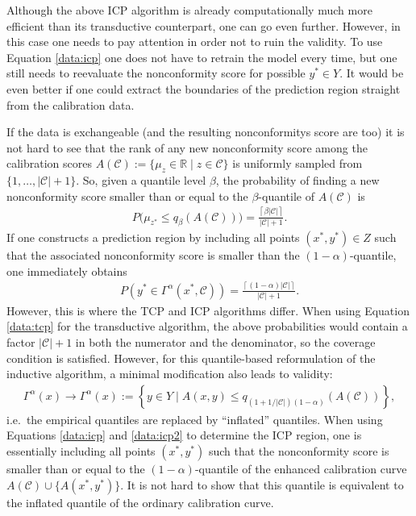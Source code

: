     \begin{property}[Validity]
        Although the above ICP algorithm is already computationally much more efficient than its transductive counterpart, one can go even further. However, in this case one needs to pay attention in order not to ruin the validity. To use Equation \eqref{data:icp} one does not have to retrain the model every time, but one still needs to reevaluate the nonconformity score for possible $y^*\in Y$. It would be even better if one could extract the boundaries of the prediction region straight from the calibration data.

        If the data is exchangeable (and the resulting nonconformitys score are too) it is not hard to see that the rank of any new nonconformity score among the calibration scores $A(\mathcal{C}):=\{\mu_z\in\mathbb{R}\mid z\in\mathcal{C}\}$ is uniformly sampled from $\{1,\ldots,|\mathcal{C}|+1\}$. So, given a quantile level $\beta$, the probability of finding a new nonconformity score smaller than or equal to the $\beta$-quantile of $A(\mathcal{C})$ is
        \begin{gather}
            P\Big(\mu_{z^*}\leq q_\beta(A(\mathcal{C}))\Big) = \frac{\left\lceil\beta|\mathcal{C}|\right\rceil}{|\mathcal{C}|+1}.
        \end{gather}
        If one constructs a prediction region by including all points $(x^*,y^*)\in Z$ such that the associated nonconformity score is smaller than the $(1-\alpha)$-quantile, one immediately obtains
        \begin{gather}
            P(y^*\in\Gamma^\alpha(x^*,\mathcal{C})) = \frac{\left\lceil(1-\alpha)|\mathcal{C}|\right\rceil}{|\mathcal{C}|+1}.
        \end{gather}
        However, this is where the TCP and ICP algorithms differ. When using Equation \eqref{data:tcp} for the transductive algorithm, the above probabilities would contain a factor $|\mathcal{C}|+1$ in both the numerator and the denominator, so the coverage condition is satisfied. However, for this quantile-based reformulation of the inductive algorithm, a minimal modification also leads to validity:
        \begin{gather}
            \Gamma^\alpha(x)\longrightarrow\Gamma^\alpha(x) := \left\{y\in Y\mid A(x,y)\leq q_{(1+1/|\mathcal{C}|)(1-\alpha)}(A(\mathcal{C}))\right\},
        \end{gather}
        i.e.~the empirical quantiles are replaced by ``inflated'' quantiles. When using Equations \eqref{data:icp} and \eqref{data:icp2} to determine the ICP region, one is essentially including all points $(x^*,y^*)$ such that the nonconformity score is smaller than or equal to the $(1-\alpha)$-quantile of the enhanced calibration curve $A(\mathcal{C})\cup\{A(x^*,y^*)\}$. It is not hard to show that this quantile is equivalent to the inflated quantile of the ordinary calibration curve.


\end{property}
